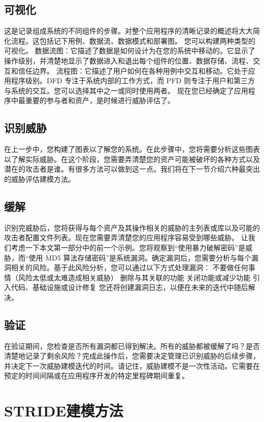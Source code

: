 \subsection[]{可视化}
这是记录组成系统的不同组件的步骤。对整个应用程序的清晰记录的概述将大大简化流程。这包括记下用例、数据流、数据模式和部署图。  您可以构建两种类型的可视化。
数据流图：它描述了数据是如何设计为在您的系统中移动的。它显示了操作级别，并清楚地显示了数据进入和退出每个组件的位置、数据存储、流程、交互和信任边界。 
流程图：它描述了用户如何在各种用例中交互和移动。它处于应用程序级别。DFD 专注于系统内部的工作方式，而 PFD 则专注于用户和第三方与系统的交互。您可以选择其中之一或同时使用两者。
现在您已经确定了应用程序中最重要的参与者和资产，是时候进行威胁评估了。
\subsection[]{识别威胁}
在上一步中，您构建了图表以了解您的系统。在此步骤中，您将需要分析这些图表以了解实际威胁。在这个阶段，您需要弄清楚您的资产可能被破坏的各种方式以及潜在的攻击者是谁。有很多方法可以做到这一点。我们将在下一节介绍六种最突出的威胁评估建模方法。 
\subsection[]{缓解}
识别完威胁后，您将获得与每个资产及其操作相关的威胁的主列表或库以及可能的攻击者配置文件列表。现在您需要弄清楚您的应用程序容易受到哪些威胁。  让我们考虑一下本文第一部分中的前一个示例。您将观察到“使用暴力破解密码”是威胁，而“使用 MD5 算法存储密码”是系统漏洞。确定漏洞后，您需要分析与每个漏洞相关的风险。基于此风险分析，您可以通过以下方式处理漏洞： 
\newline
不要做任何事情（风险太低或太难造成相关威胁）
删除与其关联的功能
关闭功能或减少功能
引入代码、基础设施或设计修复
\newline
您还将创建漏洞日志，以便在未来的迭代中随后解决。
\subsection[]{验证}
在验证期间，您检查是否所有漏洞都已得到解决。所有的威胁都被缓解了吗？是否清楚地记录了剩余风险？完成此操作后，您需要决定管理已识别威胁的后续步骤，并决定下一次威胁建模迭代的时间。请记住，威胁建模不是一次性活动。它需要在预定的时间间隔或在应用程序开发的特定里程碑期间重复。
\section{STRIDE建模方法}

